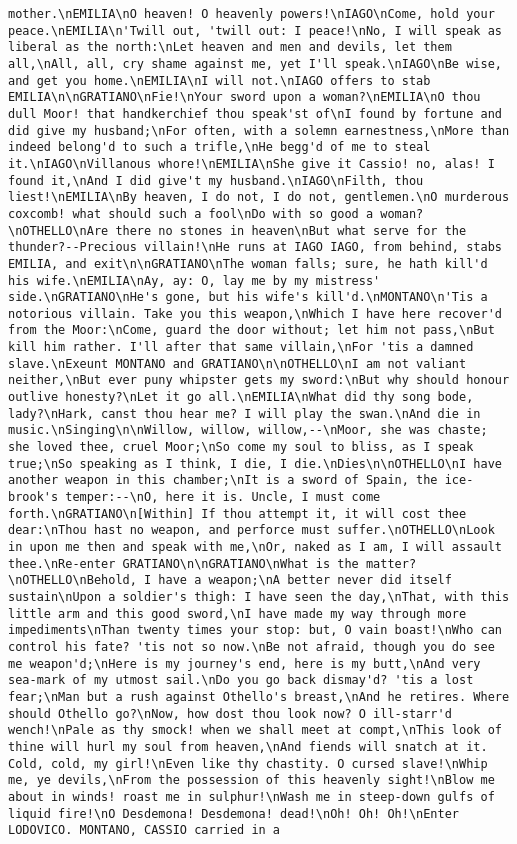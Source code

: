 \begin{verbatim}
mother.\nEMILIA\nO heaven! O heavenly powers!\nIAGO\nCome, hold your peace.\nEMILIA\n'Twill out, 'twill out: I peace!\nNo, I will speak as liberal as the north:\nLet heaven and men and devils, let them all,\nAll, all, cry shame against me, yet I'll speak.\nIAGO\nBe wise, and get you home.\nEMILIA\nI will not.\nIAGO offers to stab EMILIA\n\nGRATIANO\nFie!\nYour sword upon a woman?\nEMILIA\nO thou dull Moor! that handkerchief thou speak'st of\nI found by fortune and did give my husband;\nFor often, with a solemn earnestness,\nMore than indeed belong'd to such a trifle,\nHe begg'd of me to steal it.\nIAGO\nVillanous whore!\nEMILIA\nShe give it Cassio! no, alas! I found it,\nAnd I did give't my husband.\nIAGO\nFilth, thou liest!\nEMILIA\nBy heaven, I do not, I do not, gentlemen.\nO murderous coxcomb! what should such a fool\nDo with so good a woman?\nOTHELLO\nAre there no stones in heaven\nBut what serve for the thunder?--Precious villain!\nHe runs at IAGO IAGO, from behind, stabs EMILIA, and exit\n\nGRATIANO\nThe woman falls; sure, he hath kill'd his wife.\nEMILIA\nAy, ay: O, lay me by my mistress' side.\nGRATIANO\nHe's gone, but his wife's kill'd.\nMONTANO\n'Tis a notorious villain. Take you this weapon,\nWhich I have here recover'd from the Moor:\nCome, guard the door without; let him not pass,\nBut kill him rather. I'll after that same villain,\nFor 'tis a damned slave.\nExeunt MONTANO and GRATIANO\n\nOTHELLO\nI am not valiant neither,\nBut ever puny whipster gets my sword:\nBut why should honour outlive honesty?\nLet it go all.\nEMILIA\nWhat did thy song bode, lady?\nHark, canst thou hear me? I will play the swan.\nAnd die in music.\nSinging\n\nWillow, willow, willow,--\nMoor, she was chaste; she loved thee, cruel Moor;\nSo come my soul to bliss, as I speak true;\nSo speaking as I think, I die, I die.\nDies\n\nOTHELLO\nI have another weapon in this chamber;\nIt is a sword of Spain, the ice-brook's temper:--\nO, here it is. Uncle, I must come forth.\nGRATIANO\n[Within] If thou attempt it, it will cost thee dear:\nThou hast no weapon, and perforce must suffer.\nOTHELLO\nLook in upon me then and speak with me,\nOr, naked as I am, I will assault thee.\nRe-enter GRATIANO\n\nGRATIANO\nWhat is the matter?\nOTHELLO\nBehold, I have a weapon;\nA better never did itself sustain\nUpon a soldier's thigh: I have seen the day,\nThat, with this little arm and this good sword,\nI have made my way through more impediments\nThan twenty times your stop: but, O vain boast!\nWho can control his fate? 'tis not so now.\nBe not afraid, though you do see me weapon'd;\nHere is my journey's end, here is my butt,\nAnd very sea-mark of my utmost sail.\nDo you go back dismay'd? 'tis a lost fear;\nMan but a rush against Othello's breast,\nAnd he retires. Where should Othello go?\nNow, how dost thou look now? O ill-starr'd wench!\nPale as thy smock! when we shall meet at compt,\nThis look of thine will hurl my soul from heaven,\nAnd fiends will snatch at it. Cold, cold, my girl!\nEven like thy chastity. O cursed slave!\nWhip me, ye devils,\nFrom the possession of this heavenly sight!\nBlow me about in winds! roast me in sulphur!\nWash me in steep-down gulfs of liquid fire!\nO Desdemona! Desdemona! dead!\nOh! Oh! Oh!\nEnter LODOVICO. MONTANO, CASSIO carried in a 
\end{verbatim}
